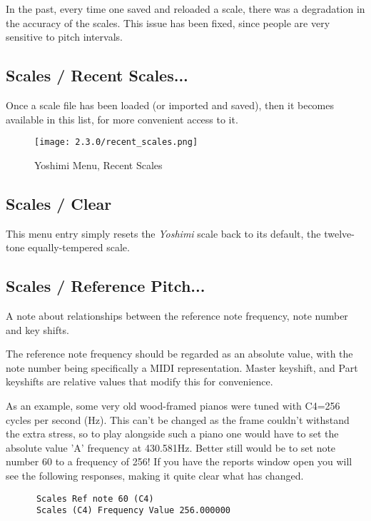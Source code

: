    In the past, every time one saved and reloaded a scale, there was a
   degradation in the accuracy of the scales.  This issue has been fixed, since
   people are very sensitive to pitch intervals.

\subsection{Scales / Recent Scales...}
\label{subsec:scales_recent_scales}

   Once a scale file has been loaded (or imported and saved), then it
   becomes available in this list, for more convenient access to it.

\begin{figure}[H]
   \centering
   \texttt{[image: 2.3.0/recent\_scales.png]}
   \caption{Yoshimi Menu, Recent Scales}
   \label{fig:yoshimi_recent_scales}
\end{figure}

\subsection{Scales / Clear}
\label{subsec:scales_clear}

   This menu entry simply resets the \textsl{Yoshimi} scale back to its default,
   the twelve-tone equally-tempered scale.

\subsection{Scales / Reference Pitch...}
\label{subsec:scales_reference_pitch}
   A note about relationships between the reference note frequency, note number
   and key shifts.

   The reference note frequency should be regarded as an absolute value, with
   the note number being specifically a MIDI representation.
   Master keyshift, and Part keyshifts are relative values that modify this for
   convenience.

   As an example, some very old wood-framed pianos were tuned with C4=256
   cycles per second (Hz). This can't be changed as the frame couldn't
   withstand the extra stress, so to play alongside such a piano one would have
   to set the absolute value 'A' frequency at 430.581Hz. Better still would be
   to set note number 60 to a frequency of 256! If you have the reports window
   open you will see the following responses, making it quite clear what has
   changed.

   \begin{verbatim}
      Scales Ref note 60 (C4)
      Scales (C4) Frequency Value 256.000000
   \end{verbatim}

